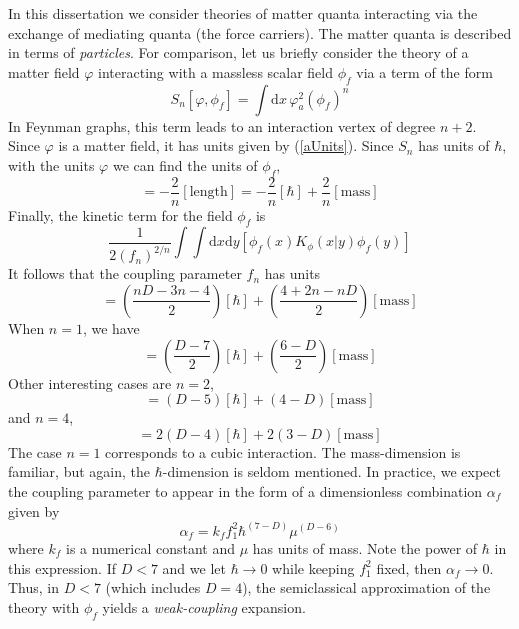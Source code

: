 In this dissertation we consider theories of matter quanta interacting via the exchange of mediating quanta (the force carriers). The matter quanta is described in terms of \textit{particles}. For comparison, let us briefly consider the theory of a matter field $\varphi$ interacting with a massless scalar field $\phi_{f}$ via a term of the form
\begin{equation}
	S_{n}[\varphi, \phi_{f}] = \int \mathrm{d}x \, \varphi_{a}^{2} (\phi_{f})^{n}
\end{equation}
In Feynman graphs, this term leads to an interaction vertex of degree $n + 2$. Since $\varphi$ is a matter field, it has units given by (\ref{aUnits}). Since $S_{n}$ has units of $\hbar$, with the units $\varphi$ we can find the units of $\phi_{f}$,
\begin{equation}
	[\phi_{f}] = - \frac{2}{n} [\text{length}] = - \frac{2}{n} [\hbar] + \frac{2}{n} [\text{mass}]
\end{equation}
Finally, the kinetic term for the field $\phi_{f}$ is
\begin{equation}
	\frac{1}{2(f_{n})^{2/n}} \int \int \mathrm{d}x \mathrm{d}y \left[ \phi_{f}(x) K_{\phi}(x|y) \phi_{f}(y)  \right] \label{Kinphif}
\end{equation}
It follows that the coupling parameter $f_{n}$ has units
\begin{equation}
	[f_{n}] = \left( \frac{nD - 3n - 4}{2} \right) [\hbar] + \left( \frac{4 + 2 n - nD}{2} \right) [\text{mass}]
\end{equation}
When $n = 1$, we have
\begin{equation}
	[f_{1}] = \left( \frac{D - 7}{2} \right) [\hbar] + \left( \frac{6 - D}{2} \right) [\text{mass}]
\end{equation}
Other interesting cases are $n = 2$,
\begin{equation}
	[f_{2}] = \left( D - 5 \right) [\hbar] + \left( 4 - D \right) [\text{mass}]
\end{equation}
and $n = 4$,
\begin{equation}
	[f_{4}] = 2\left( D - 4 \right) [\hbar] + 2\left( 3 - D \right) [\text{mass}]
\end{equation}
The case $n = 1$ corresponds to a cubic interaction. The mass-dimension is familiar, but again, the $\hbar$-dimension is seldom mentioned. In practice, we expect the coupling parameter to appear in the form of a dimensionless combination $\alpha_{f}$ given by
\begin{equation}
	\alpha_{f} = k_{f} f_{1}^{2} \hbar^{(7 - D)} \mu^{(D - 6)}
\end{equation}
where $k_{f}$ is a numerical constant and $\mu$ has units of mass. Note the power of $\hbar$ in this expression. If $D < 7$ and we let $\hbar \rightarrow 0$ while keeping $f^{2}_{1}$ fixed, then $\alpha_{f} \rightarrow 0$. Thus, in $D < 7$ (which includes $D = 4$), the semiclassical approximation of the theory with $\phi_{f}$ yields a \textit{weak-coupling} expansion.

